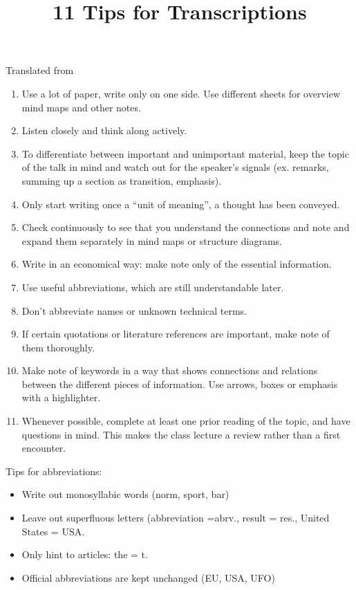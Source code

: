 \documentclass[../main.tex]{subfiles}
\begin{document}
\title{11 Tips for Transcriptions}
Translated from~\cite{Teachsam}

\begin{enumerate}
\item Use a {lot of paper}, write only on one side. Use different sheets for overview mind maps and other notes.
\item {Listen closely} and {think along actively}.
\item To differentiate between important and unimportant material, keep the topic of the talk in mind and watch out for the {speaker's signals} (ex. remarks, summing up a section as transition, emphasis). 
\item Only start writing once a ``unit of meaning'', a thought has been conveyed. 
\item Check continuously to see that you {understand the connections} and note and expand them separately in {mind maps or structure diagrams}.
\item Write in an {economical} way: make  note only of the {essential} information.
\item Use {useful abbreviations}, which are still understandable later.
\item {Don't abbreviate names} or unknown technical terms.
\item If certain {quotations or literature references} are important, make note of  them {thoroughly}.  
\item Make note of keywords in a way that shows {connections and relations} between the different pieces of information. Use {arrows, boxes or emphasis} with a highlighter. 
\item Whenever possible, complete at least one {prior reading of the topic}, and have {questions} in mind. This makes the class lecture a review rather than a first encounter.
\end{enumerate}

\newpage
Tips for abbreviations:

\begin{itemize}
\item Write out monosyllabic words (norm, sport, bar)
\item Leave out superfluous letters (abbreviation =abrv., result = res., United States = USA.
\item Only hint to articles: the = t. 
\item Official abbreviations are kept unchanged (EU, USA, UFO)
\end{itemize}
\end{document}
